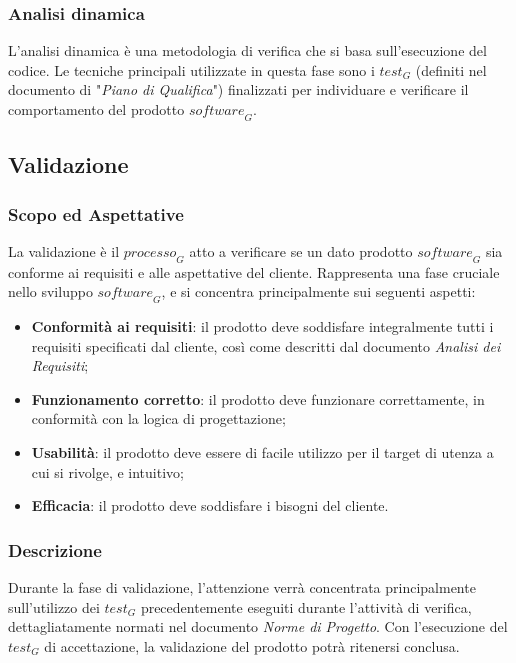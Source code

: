 \subsubsection{Analisi dinamica}
L'analisi dinamica è una metodologia di verifica che si basa sull'esecuzione del codice. Le tecniche principali utilizzate in questa fase sono i $\textit{test}_G$ (definiti nel documento di "\emph{Piano di Qualifica}") finalizzati per individuare e verificare il comportamento del prodotto $\textit{software}_G$.

\subsection{Validazione}
\subsubsection{Scopo ed Aspettative}
La validazione è il $\textit{processo}_G$ atto a verificare se un dato prodotto $\textit{software}_G$ sia conforme ai requisiti e alle aspettative del cliente. Rappresenta una fase cruciale nello sviluppo $\textit{software}_G$, e si concentra principalmente sui seguenti aspetti:
\begin{itemize}
    \item \textbf{Conformità ai requisiti}: il prodotto deve soddisfare integralmente tutti i requisiti specificati dal
cliente, così come descritti dal documento \textit{Analisi dei Requisiti};
    \item \textbf{Funzionamento corretto}: il prodotto deve funzionare correttamente, in conformità con la logica di
progettazione;
    \item \textbf{Usabilità}: il prodotto deve essere di facile utilizzo per il target di utenza a cui si rivolge, e intuitivo;
    \item \textbf{Efficacia}: il prodotto deve soddisfare i bisogni del cliente. 
\end{itemize}

\subsubsection{Descrizione}
Durante la fase di validazione, l'attenzione verrà concentrata principalmente sull'utilizzo dei $\textit{test}_G$ precedentemente eseguiti durante l'attività di verifica, dettagliatamente normati nel documento \textit{Norme di Progetto}. Con l'esecuzione del $\textit{test}_G$ di accettazione, la validazione del prodotto potrà ritenersi conclusa.
